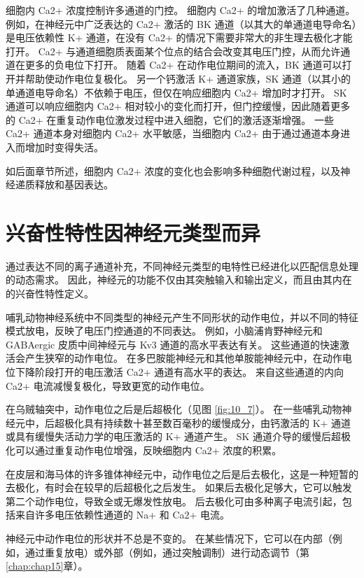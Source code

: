 细胞内 Ca2+ 浓度控制许多通道的门控。 
细胞内 Ca2+ 的增加激活了几种通道。 
例如，在神经元中广泛表达的 Ca2+ 激活的 BK 通道（以其大的单通道电导命名）是电压依赖性 K+ 通道，在没有 Ca2+ 的情况下需要非常大的非生理去极化才能打开。 
Ca2+ 与通道细胞质表面某个位点的结合会改变其电压门控，从而允许通道在更多的负电位下打开。 
随着 Ca2+ 在动作电位期间的流入，BK 通道可以打开并帮助使动作电位复极化。 
另一个钙激活 K+ 通道家族，SK 通道（以其小的单通道电导命名）不依赖于电压，但仅在响应细胞内 Ca2+ 增加时才打开。 
SK 通道可以响应细胞内 Ca2+ 相对较小的变化而打开，但门控缓慢，因此随着更多的 Ca2+ 在重复动作电位激发过程中进入细胞，它们的激活逐渐增强。 
一些 Ca2+ 通道本身对细胞内 Ca2+ 水平敏感，当细胞内 Ca2+ 由于通过通道本身进入而增加时变得失活。


如后面章节所述，细胞内 Ca2+ 浓度的变化也会影响多种细胞代谢过程，以及神经递质释放和基因表达。



\section{兴奋性特性因神经元类型而异}

通过表达不同的离子通道补充，不同神经元类型的电特性已经进化以匹配信息处理的动态需求。 
因此，神经元的功能不仅由其突触输入和输出定义，而且由其内在的兴奋性特性定义。


哺乳动物神经系统中不同类型的神经元产生不同形状的动作电位，并以不同的特征模式放电，反映了电压门控通道的不同表达。 
例如，小脑浦肯野神经元和 GABAergic 皮质中间神经元与 Kv3 通道的高水平表达有关。 
这些通道的快速激活会产生狭窄的动作电位。 在多巴胺能神经元和其他单胺能神经元中，在动作电位下降阶段打开的电压激活 Ca2+ 通道有高水平的表达。 
来自这些通道的内向 Ca2+ 电流减慢复极化，导致更宽的动作电位。


在乌贼轴突中，动作电位之后是后超极化（见图 \ref{fig:10_7}）。 
在一些哺乳动物神经元中，后超极化具有持续数十甚至数百毫秒的缓慢成分，由钙激活的 K+ 通道或具有缓慢失活动力学的电压激活的 K+ 通道产生。 
SK 通道介导的缓慢后超极化可以通过重复动作电位增强，反映细胞内 Ca2+ 浓度的积累。


在皮层和海马体的许多锥体神经元中，动作电位之后是后去极化，这是一种短暂的去极化，有时会在较早的后超极化之后发生。 
如果后去极化足够大，它可以触发第二个动作电位，导致全或无爆发性放电。 
后去极化可由多种离子电流引起，包括来自许多电压依赖性通道的 Na+ 和 Ca2+ 电流。


神经元中动作电位的形状并不总是不变的。 
在某些情况下，它可以在内部（例如，通过重复放电）或外部（例如，通过突触调制）进行动态调节（第 \ref{chap:chap15}章）。



